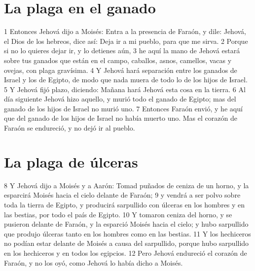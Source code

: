 \section{La plaga en el ganado}
1 Entonces Jehová dijo a Moisés: Entra a la presencia de Faraón, y dile: Jehová, el Dios de los hebreos, dice así: Deja ir a mi pueblo, para que me sirva.
2 Porque si no lo quieres dejar ir, y lo detienes aún,
3 he aquí la mano de Jehová estará sobre tus ganados que están en el campo, caballos, asnos, camellos, vacas y ovejas, con plaga gravísima.
4 Y Jehová hará separación entre los ganados de Israel y los de Egipto, de modo que nada muera de todo lo de los hijos de Israel.
5 Y Jehová fijó plazo, diciendo: Mañana hará Jehová esta cosa en la tierra.
6 Al día siguiente Jehová hizo aquello, y murió todo el ganado de Egipto; mas del ganado de los hijos de Israel no murió uno.
7 Entonces Faraón envió, y he aquí que del ganado de los hijos de Israel no había muerto uno. Mas el corazón de Faraón se endureció, y no dejó ir al pueblo.

\section{La plaga de úlceras}
8 Y Jehová dijo a Moisés y a Aarón: Tomad puñados de ceniza de un horno, y la esparcirá Moisés hacia el cielo delante de Faraón;
9 y vendrá a ser polvo sobre toda la tierra de Egipto, y producirá sarpullido con úlceras en los hombres y en las bestias, por todo el país de Egipto.
10 Y tomaron ceniza del horno, y se pusieron delante de Faraón, y la esparció Moisés hacia el cielo; y hubo sarpullido que produjo úlceras tanto en los hombres como en las bestias.
11 Y los hechiceros no podían estar delante de Moisés a causa del sarpullido, porque hubo sarpullido en los hechiceros y en todos los egipcios.
12 Pero Jehová endureció el corazón de Faraón, y no los oyó, como Jehová lo había dicho a Moisés.

